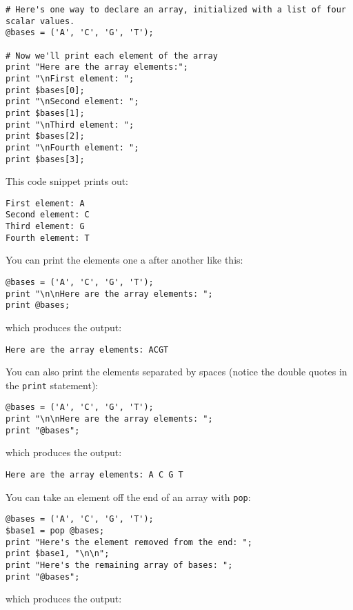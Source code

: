 \begin{lstlisting}
# Here's one way to declare an array, initialized with a list of four scalar values.
@bases = ('A', 'C', 'G', 'T');

# Now we'll print each element of the array
print "Here are the array elements:";
print "\nFirst element: ";
print $bases[0];
print "\nSecond element: ";
print $bases[1];
print "\nThird element: ";
print $bases[2];
print "\nFourth element: ";
print $bases[3];
\end{lstlisting}

This code snippet prints out:

\begin{lstlisting}
First element: A
Second element: C
Third element: G
Fourth element: T
\end{lstlisting}

You can print the elements one a after another like this:

\begin{lstlisting}
@bases = ('A', 'C', 'G', 'T');
print "\n\nHere are the array elements: ";
print @bases;
\end{lstlisting}

which produces the output:

\begin{lstlisting}
Here are the array elements: ACGT
\end{lstlisting}

You can also print the elements separated by spaces (notice the double quotes in the \verb|print| statement): 

\begin{lstlisting}
@bases = ('A', 'C', 'G', 'T');
print "\n\nHere are the array elements: ";
print "@bases";
\end{lstlisting}

which produces the output:

\begin{lstlisting}
Here are the array elements: A C G T
\end{lstlisting}

You can take an element off the end of an array with \verb|pop|: 

\begin{lstlisting}
@bases = ('A', 'C', 'G', 'T');
$base1 = pop @bases;
print "Here's the element removed from the end: ";
print $base1, "\n\n";
print "Here's the remaining array of bases: ";
print "@bases";
\end{lstlisting}

which produces the output:

